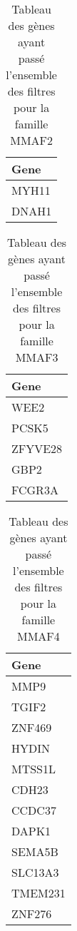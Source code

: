 \documentclass[12pt,twoside]{reedthesis}
\theoremstyle{definition}
\theoremstyle{definition}
\theoremstyle{remark}
\begin{document}
  \begin{table}
  
  \caption{\label{tab:tablegenemmaf2}Tableau des gènes ayant passé l'ensemble des filtres pour la famille MMAF2}
  \centering
  \begin{tabular}[t]{l}
  \hline
  Gene\\
  \hline
  MYH11\\
  \hline
  DNAH1\\
  \hline
  \end{tabular}
  \end{table}
  
  \begin{table}
  
  \caption{\label{tab:tablegenemmaf3}Tableau des gènes ayant passé l'ensemble des filtres pour la famille MMAF3}
  \centering
  \begin{tabular}[t]{l}
  \hline
  Gene\\
  \hline
  WEE2\\
  \hline
  PCSK5\\
  \hline
  ZFYVE28\\
  \hline
  GBP2\\
  \hline
  FCGR3A\\
  \hline
  \end{tabular}
  \end{table}
  
  \begin{table}
  
  \caption{\label{tab:tablegenemmaf4}Tableau des gènes ayant passé l'ensemble des filtres pour la famille MMAF4}
  \centering
  \begin{tabular}[t]{l}
  \hline
  Gene\\
  \hline
  MMP9\\
  \hline
  TGIF2\\
  \hline
  ZNF469\\
  \hline
  HYDIN\\
  \hline
  MTSS1L\\
  \hline
  CDH23\\
  \hline
  CCDC37\\
  \hline
  DAPK1\\
  \hline
  SEMA5B\\
  \hline
  SLC13A3\\
  \hline
  TMEM231\\
  \hline
  ZNF276\\
  \hline
  \end{tabular}
  \end{table}
  
\end{document}
